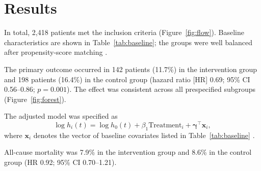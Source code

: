 \section{Results}
\label{sec:results}

In total, 2,418 patients met the inclusion criteria (Figure~\ref{fig:flow}). Baseline characteristics are shown in Table~\ref{tab:baseline}; the groups were well balanced after propensity-score matching \cite{austin2011introduction}.

The primary outcome occurred in 142 patients (11.7\%) in the intervention group and 198 patients (16.4\%) in the control group (hazard ratio [HR] 0.69; 95\% CI 0.56--0.86; $p = 0.001$). The effect was consistent across all prespecified subgroups (Figure~\ref{fig:forest}).

The adjusted model was specified as
\begin{equation}
  \log h_i(t) = \log h_0(t) + \beta_1 \text{Treatment}_i + \boldsymbol{\gamma}^\top \mathbf{x}_i ,
  \label{eq:cox}
\end{equation}
where $\mathbf{x}_i$ denotes the vector of baseline covariates listed in Table~\ref{tab:baseline} \cite{cox1972regression, therneau2000modeling}.

All-cause mortality was 7.9\% in the intervention group and 8.6\% in the control group (HR 0.92; 95\% CI 0.70--1.21).
